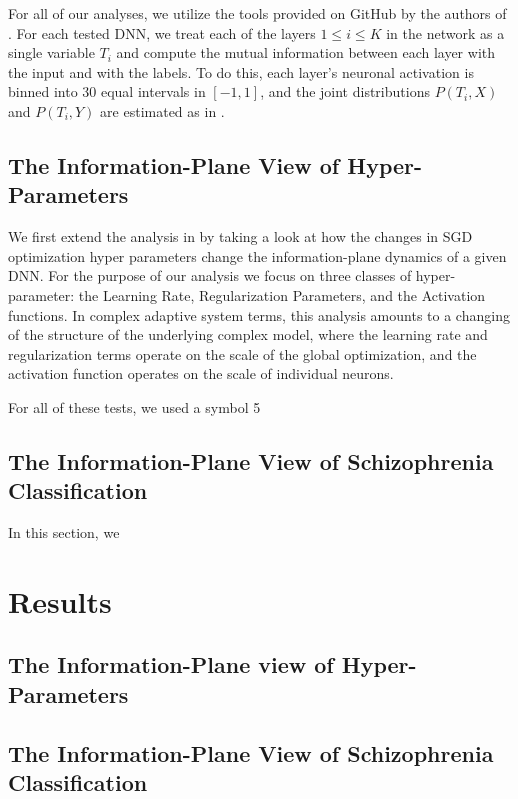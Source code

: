 \documentclass[conference, 5pt]{IEEEtran}
\begin{document}
For all of our analyses, we utilize the tools provided on GitHub by the authors of \cite{shwartz2017opening}.  For each tested DNN, we treat each of the layers $1\le i\le K$ in the network as a single variable $T_i$ and compute the mutual information between each layer with the input and with the labels. To do this, each layer's neuronal activation is binned into 30 equal intervals in $[-1, 1]$, and the joint distributions $P(T_i,X)$ and $P(T_i,Y)$ are estimated as in \cite{shwartz2017opening}.

\subsection{The Information-Plane View of Hyper-Parameters}

We first extend the analysis in \cite{shwartz2017opening} by taking a look at how the changes in SGD optimization hyper parameters change the information-plane dynamics of a given DNN. For the purpose of our analysis we focus on three classes of hyper-parameter: the Learning Rate, Regularization Parameters, and the Activation functions. In complex adaptive system terms, this analysis amounts to a changing of the structure of the underlying complex model, where the learning rate and regularization terms operate on the scale of the global optimization, and the activation function operates on the scale of individual neurons. 

For all of these tests, we used a symbol 5



\subsection{The Information-Plane View of Schizophrenia Classification}

In this section, we 

\section{Results}

\subsection{The Information-Plane view of Hyper-Parameters}

\subsection{The Information-Plane View of Schizophrenia Classification}
\end{document}
